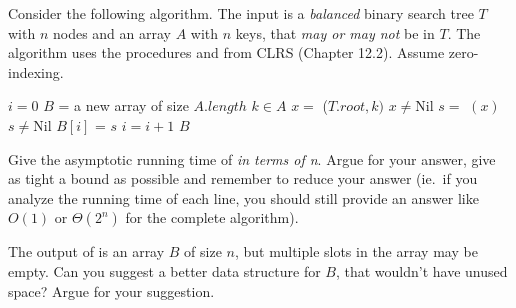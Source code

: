 \documentclass{article}
\begin{document}
\begin{Exercise}[title={Question from the 2024 re-exam}]
    
    \ExeText
    \noindent
    Consider the following algorithm. The input is a \textit{balanced}
    binary search tree $T$ with $n$ nodes and an array $A$ with $n$ keys,
    that \textit{may or may not} be in $T$. The algorithm uses the
    procedures  and 
    from CLRS (Chapter 12.2). Assume zero-indexing.

    \begin{codebox}
        \li $i = 0$
        \li $B$ = a new array of size $A.\mathit{length}$
            \li \For $k \in A$ \Do
            \li $x =$ ($T.\mathit{root}, k)$
                \li \If $x \neq \mathrm{Nil}$ \Then
                    \li $s =$ $(x)$
                    \li \If $s \neq \mathrm{Nil}$ \Then
                        \li $B[i]$ = $s$
                        \li $i = i + 1$
                    \End
                \End
            \End
        \li \Return $B$
    \end{codebox}


    \Question
    Give the asymptotic running time of  \textit{in terms of
    n}. Argue for your answer, give as tight a bound as possible and remember to
    reduce your answer (ie.\ if you analyze the running time of each line, you
    should still provide an answer like $O(1)$ or $\Theta(2^n)$ for the complete
    algorithm).

    \Question
    The output of  is an array $B$ of size $n$, but multiple
    slots in the array may be empty. Can you suggest a better data structure for
    $B$, that wouldn't have unused space? Argue for your suggestion.


\end{Exercise}
\end{document}

